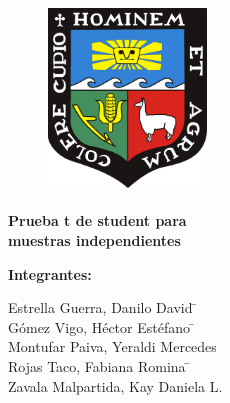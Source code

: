 \documentclass[
]{article}
\author{}
\date{\vspace{-2.5em}}
\begin{document}
\begin{titlepage}
\begin{center}
\vspace*{\baselineskip}

{\bf\fontsize{19}{0}{\selectfont{ UNIVERSIDAD NACIONAL   AGRARIA \\ [0.5cm] LA MOLINA}}\\[0.5cm]
\\ [0.5cm]
\bf\fontsize{14}{0}{\selectfont{ CARRERA PROFESIONAL DE ESTADÍSTICA E INFORMÁTICA}}
}\\[0.5cm]
\end{center}
\begin{center}
\vspace*{0.3in}
\begin{figure}[htb]
\begin{center}
\includegraphics[width=4.2cm,height=5cm]{imagen.jpg}
\end{center}
\end{figure}
\vspace*{0.1in}
\begin{Large}
\textbf{Prueba t de student para \\  muestras independientes } \\
\end{Large}
\vspace{0.4cm}
\begin{large}

\begin{center}
\textbf{Integrantes:}

\begin{tabbing}
    \hspace{2cm} Estrella Guerra, Danilo David \quad \=  \\
    \hspace{2cm} Gómez Vigo, Héctor Estéfano   \quad \=  \\
    \hspace{2cm} Montufar Paiva, Yeraldi Mercedes  \\
    \hspace{2cm} Rojas Taco, Fabiana Romina    \quad \=  \\
    \hspace{2cm} Zavala Malpartida, Kay Daniela L.  \\
\end{tabbing}


\end{center}
\end{large}
\end{center}
\end{titlepage}
\end{document}
